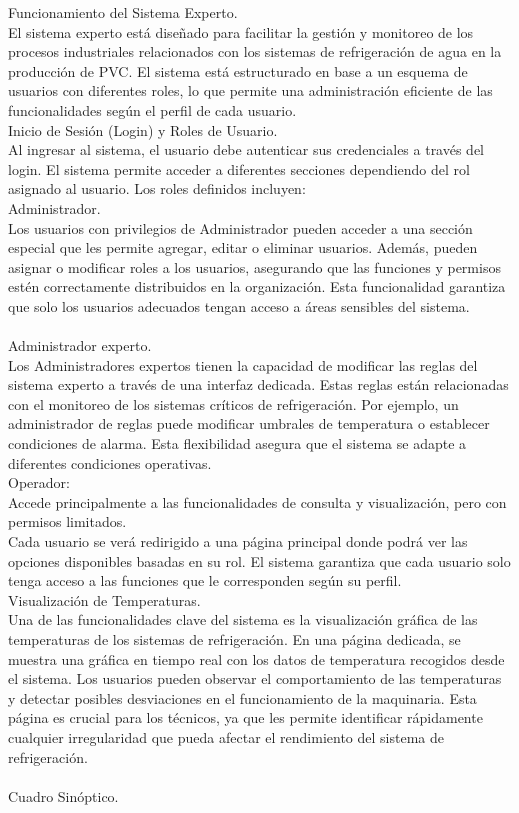 Funcionamiento del Sistema Experto.\\
El sistema experto está diseñado para facilitar la gestión y monitoreo de los procesos industriales relacionados con los sistemas de refrigeración de agua en la producción de PVC. El sistema está estructurado en base a un esquema de usuarios con diferentes roles, lo que permite una administración eficiente de las funcionalidades según el perfil de cada usuario. \\
Inicio de Sesión (Login) y Roles de Usuario. \\
Al ingresar al sistema, el usuario debe autenticar sus credenciales a través del login. El sistema permite acceder a diferentes secciones dependiendo del rol asignado al usuario. Los roles definidos incluyen: \\
Administrador.\\
Los usuarios con privilegios de Administrador pueden acceder a una sección especial que les permite agregar, editar o eliminar usuarios. Además, pueden asignar o modificar roles a los usuarios, asegurando que las funciones y permisos estén correctamente distribuidos en la organización. Esta funcionalidad garantiza que solo los usuarios adecuados tengan acceso a áreas sensibles del sistema. \\
\\
Administrador experto. \\
Los Administradores expertos tienen la capacidad de modificar las reglas del sistema experto a través de una interfaz dedicada. Estas reglas están relacionadas con el monitoreo de los sistemas críticos de refrigeración. Por ejemplo, un administrador de reglas puede modificar umbrales de temperatura o establecer condiciones de alarma. Esta flexibilidad asegura que el sistema se adapte a diferentes condiciones operativas. \\
Operador: \\
Accede principalmente a las funcionalidades de consulta y visualización, pero con permisos limitados. \\
Cada usuario se verá redirigido a una página principal donde podrá ver las opciones disponibles basadas en su rol. El sistema garantiza que cada usuario solo tenga acceso a las funciones que le corresponden según su perfil. \\
Visualización de Temperaturas.\\
Una de las funcionalidades clave del sistema es la visualización gráfica de las temperaturas de los sistemas de refrigeración. En una página dedicada, se muestra una gráfica en tiempo real con los datos de temperatura recogidos desde el sistema. Los usuarios pueden observar el comportamiento de las temperaturas y detectar posibles desviaciones en el funcionamiento de la maquinaria. Esta página es crucial para los técnicos, ya que les permite identificar rápidamente cualquier irregularidad que pueda afectar el rendimiento del sistema de refrigeración.\\
\\
Cuadro Sinóptico. \\

